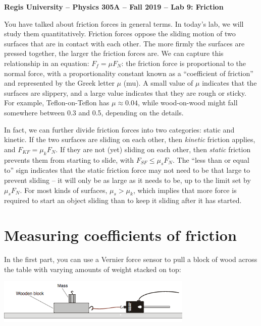 \documentclass[11pt]{article}
\begin{document}
\begin{center}
{\bf{Regis University -- Physics 305A -- Fall 2019 -- Lab 9: Friction}} 
\end{center}

\noindent You have talked about friction forces in general terms.  In today's lab, we will study them quantitatively.  Friction forces oppose the sliding motion of two surfaces that are in 
contact with each other.  The more firmly the surfaces are
pressed together, the larger the friction forces are.  We can capture 
this relationship in an equation: $F_f = \mu F_N$: the friction force is
proportional to the normal force, with a proportionality constant known 
as a ``coefficient of friction'' and represented by the Greek 
letter $\mu$ (mu).  A small value of $\mu$ indicates that the surfaces 
are slippery, and a large value indicates that they are rough or sticky.
For example, Teflon-on-Teflon has $\mu \approx 0.04$, while wood-on-wood 
might fall somewhere between 0.3 and 0.5, depending on the details.

In fact, we can further divide friction forces into two categories: static 
and kinetic.  If the two surfaces are sliding on each other, then {\em kinetic}
friction applies, and $F_{KF} = \mu_k F_N$.  If they are not (yet) sliding
on each other, then {\em static} friction prevents them from starting to slide,
with $F_{SF} \le \mu_s F_N$.  The ``less than or equal to'' sign indicates 
that the static friction force may not need to be that large to prevent
sliding -- it will only be as large as it needs to be, up to the limit 
set by $\mu_s F_N$.   For most kinds of surfaces, $\mu_s > \mu_k$, which 
implies that more force is required to start an object sliding than to 
keep it sliding after it has started.  

\section{Measuring coefficients of friction}

In the first part, you can use a Vernier force sensor to pull a block of wood 
across the table with varying amounts of weight stacked on top:

\includegraphics[width=0.7\textwidth]{FrictionBlock.png}
\end{document}

